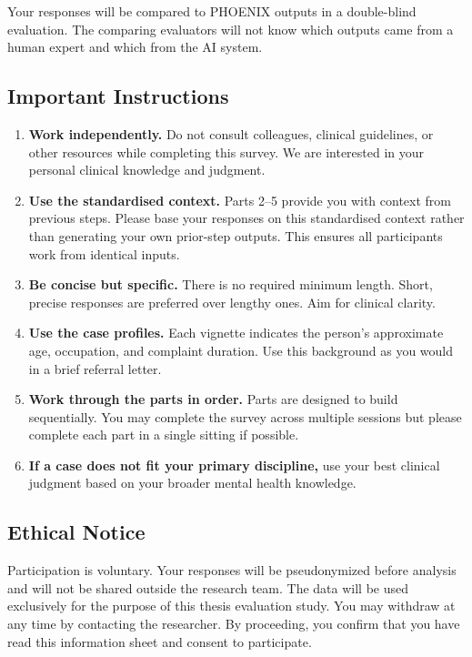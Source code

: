 \documentclass[11pt,a4paper]{article}
\begin{document}
Your responses will be compared to PHOENIX outputs in a double-blind evaluation. The comparing evaluators will not know which outputs came from a human expert and which from the AI system.

\subsection{Important Instructions}

\begin{instrbox}[title=Please read before beginning]
\begin{enumerate}
\item \textbf{Work independently.} Do not consult colleagues, clinical guidelines, or other resources while completing this survey. We are interested in your personal clinical knowledge and judgment.
\item \textbf{Use the standardised context.} Parts 2--5 provide you with context from previous steps. Please base your responses on this standardised context rather than generating your own prior-step outputs. This ensures all participants work from identical inputs.
\item \textbf{Be concise but specific.} There is no required minimum length. Short, precise responses are preferred over lengthy ones. Aim for clinical clarity.
\item \textbf{Use the case profiles.} Each vignette indicates the person's approximate age, occupation, and complaint duration. Use this background as you would in a brief referral letter.
\item \textbf{Work through the parts in order.} Parts are designed to build sequentially. You may complete the survey across multiple sessions but please complete each part in a single sitting if possible.
\item \textbf{If a case does not fit your primary discipline,} use your best clinical judgment based on your broader mental health knowledge.
\end{enumerate}
\end{instrbox}

\subsection{Ethical Notice}

Participation is voluntary. Your responses will be pseudonymized before analysis and will not be shared outside the research team. The data will be used exclusively for the purpose of this thesis evaluation study. You may withdraw at any time by contacting the researcher. By proceeding, you confirm that you have read this information sheet and consent to participate.
\end{document}
